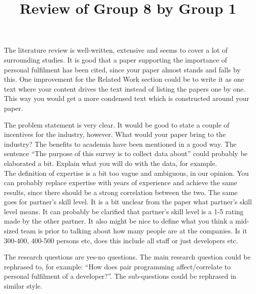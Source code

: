 \documentclass[times, 10pt,twocolumn]{IEEEtran}
\begin{document}
\title{Review of Group 8 by Group 1}

\author{


}


\maketitle
\thispagestyle{empty}







The literature review is well-written, extensive and seems to cover a lot of surrounding studies. It is good that a paper supporting the importance of personal fulfilment has been cited, since your paper almost stands and falls by this. One improvement for the Related Work section could be to write it as one text where your content drives the text instead of listing the papers one by one. This way you would get a more condensed text which is constructed around your paper. 

The problem statement is very clear. It would be good to state a couple of incentives for the industry, however. What would your paper bring to the industry? The benefits to academia have been mentioned in a good way. The sentence ``The purpose of this survey is to collect data about'' could probably be elaborated a bit. Explain what you will do with the data, for example. 
\\

The definition of expertise is a bit too vague and ambiguous, in our opinion. You can probably replace expertise with years of experience and achieve the same results, since there should be a strong correlation between the two. The same goes for partner's skill level. It is a bit unclear from the paper what partner's skill level means. It can probably be clarified that partner's skill level is a 1-5 rating made by the other partner. It also might be nice to define what you think a mid-sized team is prior to talking about how many people are at the companies. Is it 300-400, 400-500 persons etc, does this include all staff or just developers etc.


The research questions are yes-no questions. The main research question could be rephrased to, for example: ``How does pair programming affect/correlate to personal fulfilment of a developer?''. The sub-questions could be rephrased in similar style. 
\\
\end{document}
